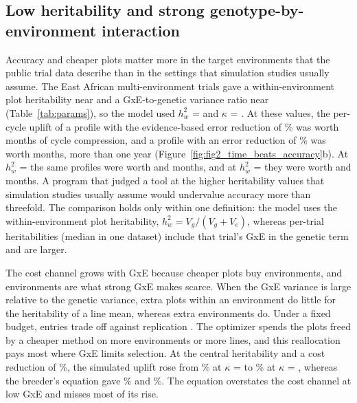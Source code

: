\subsection{Low heritability and strong genotype-by-environment interaction}\label{sec:disc_gxe}

Accuracy and cheaper plots matter more in the target environments that the public trial data describe than in the settings that simulation studies usually assume. The East African multi-environment trials gave a within-environment plot heritability near \NumEmpTZHtwoAll and a GxE-to-genetic variance ratio near \NumEmpTZKappaAll (Table~\ref{tab:params}), so the model used $h^2_w$ = \NumCfgHtwoYield and $\kappa$ = \NumCfgKappa. At these values, the per-cycle uplift of a profile with the evidence-based error reduction of \NumCfgErrRedCentral\% was worth \NumExchMoHtwoTenErrTen months of cycle compression, and a profile with an error reduction of \NumCfgErrRedMax\% was worth \NumExchMoHtwoTenErrFifty months, more than one year (Figure~\ref{fig:fig2_time_beats_accuracy}b). At $h^2_w$ = \NumCfgRobHtwoHigh the same profiles were worth \NumExchMoHtwoThirtyErrTen and \NumExchMoHtwoThirtyErrFifty months, and at $h^2_w$ = \NumCfgRobHtwoLow they were worth \NumExchMoHtwoFiveErrTen and \NumExchMoHtwoFiveErrFifty months. A program that judged a tool at the higher heritability values that simulation studies usually assume would undervalue accuracy more than threefold. The comparison holds only within one definition: the model uses the within-environment plot heritability, $h^2_w = V_g/(V_g+V_e)$, whereas per-trial heritabilities (median \NumEmpTrialHtwoMedTZ in one dataset) include that trial's GxE in the genetic term and are larger.

The cost channel grows with GxE because cheaper plots buy environments, and environments are what strong GxE makes scarce. When the GxE variance is large relative to the genetic variance, extra plots within an environment do little for the heritability of a line mean, whereas extra environments do. Under a fixed budget, entries trade off against replication \citep{Lorenz2013Resource}. The optimizer spends the plots freed by a cheaper method on more environments or more lines, and this reallocation pays most where GxE limits selection. At the central heritability and a cost reduction of \NumBEcostRedMax\%, the simulated uplift rose from \NumBEcostKappaLoSim\% at $\kappa$ = \NumCfgRobKappaLow to \NumBEcostKappaHiSim\% at $\kappa$ = \NumCfgRobKappaHigh, whereas the breeder's equation gave \NumBEcostKappaLoBE\% and \NumBEcostKappaHiBE\%. The equation overstates the cost channel at low GxE and misses most of its rise.

